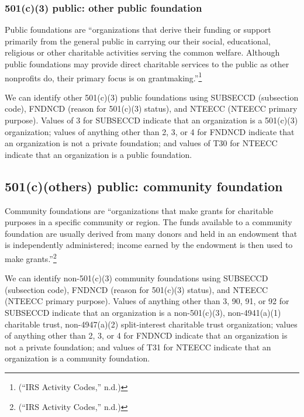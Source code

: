 \documentclass[
  letterpaper,
  DIV=11,
  numbers=noendperiod,
  oneside]{scrreprt}
\begin{document}
\hypertarget{c3-public-other-public-foundation}{%
\subsubsection{501(c)(3) public: other public
foundation}\label{c3-public-other-public-foundation}}

Public foundations are ``organizations that derive their funding or
support primarily from the general public in carrying our their social,
educational, religious or other charitable activities serving the common
welfare. Although public foundations may provide direct charitable
services to the public as other nonprofits do, their primary focus is on
grantmaking.''\footnote{({``IRS Activity Codes,''} n.d.)}

We can identify other 501(c)(3) public foundations using SUBSECCD
(subsection code), FNDNCD (reason for 501(c)(3) status), and NTEECC
(NTEECC primary purpose). Values of 3 for SUBSECCD indicate that an
organization is a 501(c)(3) organization; values of anything other than
2, 3, or 4 for FNDNCD indicate that an organization is not a private
foundation; and values of T30 for NTEECC indicate that an organization
is a public foundation.

\hypertarget{cothers-public-community-foundation}{%
\subsection{501(c)(others) public: community
foundation}\label{cothers-public-community-foundation}}

Community foundations are ``organizations that make grants for
charitable purposes in a specific community or region. The funds
available to a community foundation are usually derived from many donors
and held in an endowment that is independently administered; income
earned by the endowment is then used to make grants.''\footnote{({``IRS
  Activity Codes,''} n.d.)}

We can identify non-501(c)(3) community foundations using SUBSECCD
(subsection code), FNDNCD (reason for 501(c)(3) status), and NTEECC
(NTEECC primary purpose). Values of anything other than 3, 90, 91, or 92
for SUBSECCD indicate that an organization is a non-501(c)(3),
non-4941(a)(1) charitable trust, non-4947(a)(2) split-interest
charitable trust organization; values of anything other than 2, 3, or 4
for FNDNCD indicate that an organization is not a private foundation;
and values of T31 for NTEECC indicate that an organization is a
community foundation.
\end{document}
